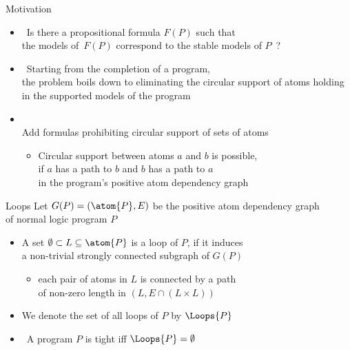 \begin{frame}[c]{Motivation}
  \begin{itemize}
  \item<1->  \
    Is there a propositional formula $F(P)$ such that\\ the models of~$F(P)$ correspond to the
    stable models of $P$~?
    \bigskip
  \item<2->  \
    Starting from the completion of a program,\\
    the problem boils down to eliminating the circular support of atoms
    holding in the supported models of the program
    \bigskip
  \item<3->  \\
    \smallskip
    Add formulas prohibiting circular support of sets of atoms
    \medskip
    \begin{itemize}\normalsize
    \item<4->[\itarrow]
      Circular support between atoms $a$ and $b$ is possible,\\
      if $a$ has a path to $b$ and $b$ has a path to $a$\\
      in the program's positive atom dependency graph
    \end{itemize}
  \end{itemize}
\end{frame}
\begin{frame}{Loops}
  \bigskip
  Let $G(P) = (\atom{P},E)$ be the positive atom dependency graph\\ of normal logic program $P$
  \par
  \smallskip
  \begin{itemize}
  \item<2-> A set $\emptyset\subset L \subseteq \atom{P}$ is a \alert{loop} of $P$,
    if it induces\\ a non-trivial strongly connected subgraph of $G(P)$
    \begin{itemize}\normalsize
    \item<3->[\itarrow] each pair of atoms in $L$ is connected by a path\\
      of non-zero length in $(L,E\cap(L \times L))$
    \end{itemize}
    \medskip
  \item<4-> We denote the set of all loops of $P$ by $\Loops{P}$
    \medskip
  \item<5-> \structure{Note} \ A program $P$ is tight iff $\Loops{P}=\emptyset$
  \end{itemize}
\end{frame}
